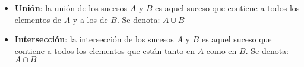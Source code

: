 \setlength{\parskip}{5mm}
\begin{itemize}
\item \textbf{Unión}: la unión de los sucesos $A$ y $B$ es aquel suceso que contiene a todos los elementos de $A$ y a  los de $B$. Se denota: $A\cup B$ 




\item \textbf{Intersección}: la intersección de los sucesos $A$ y $B$ es aquel suceso que contiene a todos los elementos que están tanto en $A$ como en $B$. Se denota: $A\cap B$  



\end{itemize}

